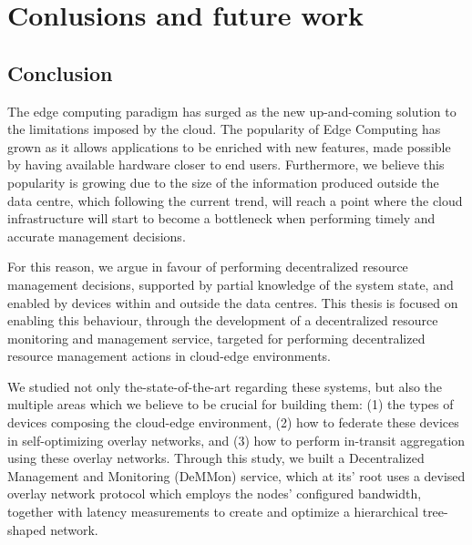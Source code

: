 

\chapter{Conlusions and future work} \label{cha:conclusions_future_work}

\section{Conclusion}

The edge computing paradigm has surged as the new up-and-coming solution to the limitations imposed by the cloud. The popularity of Edge Computing has grown as it allows applications to be enriched with new features, made possible by having available hardware closer to end users. Furthermore, we believe this popularity is growing due to the size of the information produced outside the data centre, which following the current trend, will reach a point where the cloud infrastructure will start to become a bottleneck when performing timely and accurate management decisions. 

For this reason, we argue in favour of performing decentralized resource management decisions, supported by partial knowledge of the system state, and enabled by devices within and outside the data centres. This thesis is focused on enabling this behaviour, through the development of a decentralized resource monitoring and management service, targeted for performing decentralized resource management actions in cloud-edge environments.

We studied not only the-state-of-the-art regarding these systems, but also the multiple areas which we believe to be crucial for building them: (1) the types of devices composing the cloud-edge environment, (2) how to federate these devices in self-optimizing overlay networks, and (3) how to perform in-transit aggregation using these overlay networks. Through this study, we built a Decentralized Management and Monitoring (DeMMon) service, which at its’ root uses a devised overlay network protocol which employs the nodes' configured bandwidth, together with latency measurements to create and optimize a hierarchical tree-shaped network.

